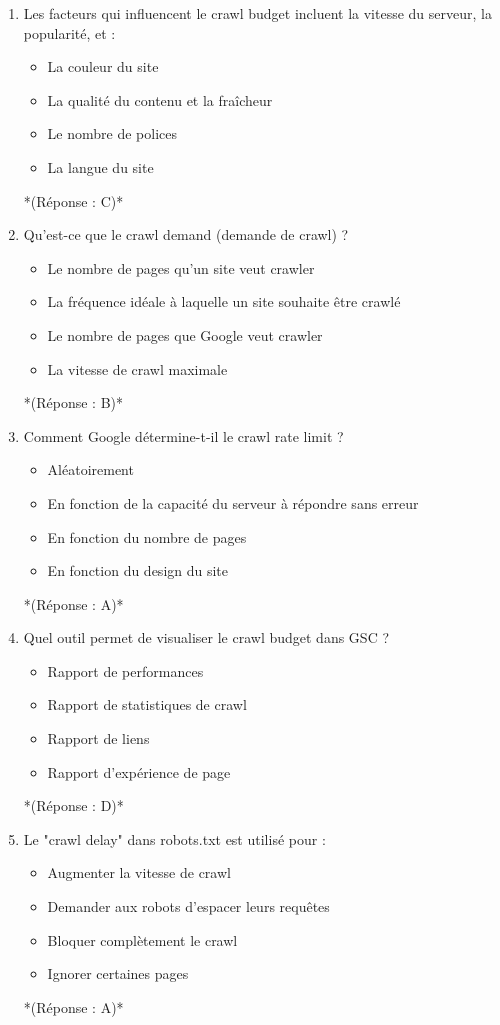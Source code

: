 \documentclass[12pt,a4paper,twoside]{report}
\begin{document}
\begin{enumerate}
\item Les facteurs qui influencent le crawl budget incluent la vitesse du serveur, la popularité, et :
\begin{itemize}
\item[A)] La couleur du site
\item[B)] La qualité du contenu et la fraîcheur
\item[C)] Le nombre de polices
\item[D)] La langue du site
\end{itemize}
*(Réponse : C)*

\item Qu'est-ce que le crawl demand (demande de crawl) ?
\begin{itemize}
\item[A)] Le nombre de pages qu'un site veut crawler
\item[B)] La fréquence idéale à laquelle un site souhaite être crawlé
\item[C)] Le nombre de pages que Google veut crawler
\item[D)] La vitesse de crawl maximale
\end{itemize}
*(Réponse : B)*

\item Comment Google détermine-t-il le crawl rate limit ?
\begin{itemize}
\item[A)] Aléatoirement
\item[B)] En fonction de la capacité du serveur à répondre sans erreur
\item[C)] En fonction du nombre de pages
\item[D)] En fonction du design du site
\end{itemize}
*(Réponse : A)*

\item Quel outil permet de visualiser le crawl budget dans GSC ?
\begin{itemize}
\item[A)] Rapport de performances
\item[B)] Rapport de statistiques de crawl
\item[C)] Rapport de liens
\item[D)] Rapport d'expérience de page
\end{itemize}
*(Réponse : D)*

\item Le "crawl delay" dans robots.txt est utilisé pour :
\begin{itemize}
\item[A)] Augmenter la vitesse de crawl
\item[B)] Demander aux robots d'espacer leurs requêtes
\item[C)] Bloquer complètement le crawl
\item[D)] Ignorer certaines pages
\end{itemize}
*(Réponse : A)*


\end{enumerate}
\end{document}
